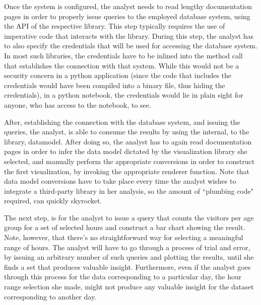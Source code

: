 Once the system is configured, the analyst needs to read lengthy documentation pages in order to properly issue queries to the employed database system, using the API of the respective library. This step typically requires the use of imperative code that interacts with the library. During this step, the analyst has to also specify the credentials that will be used for accessing the database system. In most such libraries, the credentials have to be inlined into the method call that establishes the connection with that system. While this would not be a security concern in a python application (since the code that includes the credentials would have been compiled into a binary file, thus hiding the credentials), in a python notebook, the credentials would lie in plain sight for anyone, who has access to the notebook, to see.

After, establishing the connection with the database system, and issuing the queries, the analyst, is able to consume the results by using the internal, to the library, datamodel. After doing so, the analyst has to again read documentation pages in order to infer the data model dictated by the visualization library she selected, and manually perform the appropriate conversions in order to construct the first visualization, by invoking the appropriate renderer function. Note that data model conversions have to take place every time the analyst wishes to integrate a third-party library in her analysis, so the amount of ``plumbing code" required, can quickly skyrocket.


The next step, is for the analyst to issue a query that counts the visitors per age group for a set of selected hours and construct a bar chart showing the result. Note, however, that there's no straightforward way for selecting a meaningful range of hours. The analyst will have to go through a process of trial and error, by issuing an arbitrary number of such queries and plotting the results, until she finds a set that produces valuable insight. Furthermore, even if the analyst goes through this process for the data corresponding to a particular day, the hour range selection she made, might not produce any valuable insight for the dataset corresponding to another day. 

